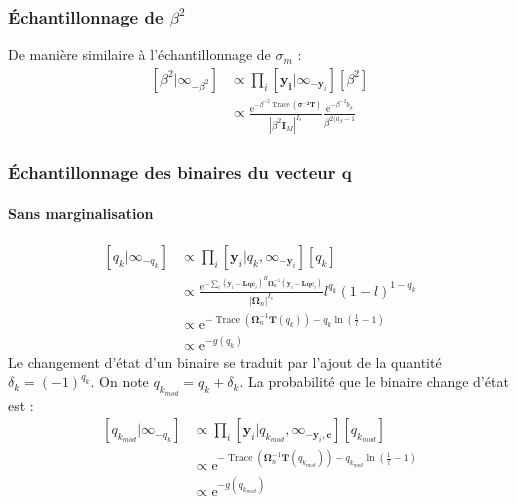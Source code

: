 \documentclass[ 12pt]{article}
\renewenvironment{equation}{\vspace{-0.2cm}\begin{oldequation}}{\vspace{-0.2cm}\end{oldequation}}
\newcommand{\e}{\mathrm{e}}
\begin{document}
\begin{equation}
\end{equation}


\subsubsection[]{Échantillonnage de $\beta^2$}
De manière similaire à l'échantillonnage de $\sigma_m$ : 
\begin{align*}
	\left[ \beta^2 | \infty_{-\beta^2} \right] &\propto  \prod_i [\bm{y_i}| \infty_{-\bm{y}_i}][\beta^2]\\
	& \propto \frac{\e^{-\beta^{-2}\operatorname{Trace}(\bm{\sigma^{-2}\bm{T}})}}{|\beta^{2}\bm{I}_M|^{I_s}} \frac{\e^{-\beta^{-2}b_\beta}}{\beta^{2(a_\beta-1}}
\end{align*}


\begin{equation}
\end{equation}

\subsubsection[]{Échantillonnage des binaires du vecteur $\bm{q}$}

\paragraph{Sans marginalisation}
\begin{align*}
	\left[q_k | \infty	_{-q_k}  \right] &\propto \prod_i  \left[ \bm{y}_i |q_k, \infty_{-\bm{y}_i} \right] [q_k]\\
	&\propto  \frac{\e^{-\sum_i (\bm{y}_i-\bm{Lqc}_i)^H \bm{\Omega}_n^{-1}(\bm{y}_i - \bm{Lqc}_i) }}{|\bm{\Omega}_n|^{I_s}}   l^{q_k}(1-l)^{1-q_k}\\
	& \propto \e^{-\operatorname{Trace}\left(  \bm{\Omega}_n^{-1}  \bm{T}(q_k) \right)  -q_k \ln\left( \frac{1}{l}-1 \right)}\\
	& \propto \e^{- g(q_k)}
\end{align*}
Le changement d'état d'un binaire se traduit par l'ajout de la quantité $\delta_k = (-1)^{q_k}$. On note $q_{k_{mod}}=q_k + \delta_k$.
La probabilité que le binaire change d'état est : 
\begin{align*}
	\left[q_{k_{mod}} | \infty	_{-q_k}  \right] & \propto  \prod_i  \left[ \bm{y}_i | q_{k_{mod}}, \infty_{-\bm{y}_i,\bm{c}} \right][q_{k_{mod}}]\\
	& \propto \e^{-\operatorname{Trace}\left(  \bm{\Omega}_n^{-1}  \bm{T}(q_{k_{mod}}) \right)  -q_{k_{mod}} \ln\left( \frac{1}{l}-1 \right)}\\
	& \propto \e^{- g(q_{k_{mod}})}
\end{align*}
\end{document}
